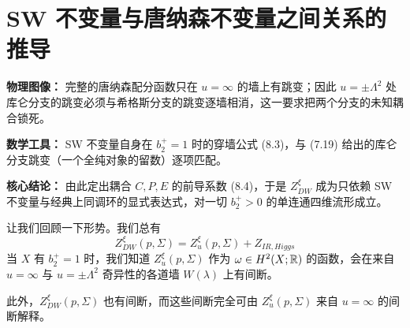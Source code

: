 
\section{SW 不变量与唐纳森不变量之间关系的推导}

\begin{keytakeaways}
\item \textbf{物理图像：} 完整的唐纳森配分函数只在 $u=\infty$ 的墙上有跳变；因此 $u=\pm\Lambda^{2}$ 处库仑分支的跳变必须与希格斯分支的跳变逐墙相消，这一要求把两个分支的未知耦合锁死。
\item \textbf{数学工具：} SW 不变量自身在 $b_2^{+}=1$ 时的穿墙公式 (8.3)，与 (7.19) 给出的库仑分支跳变（一个全纯对象的留数）逐项匹配。
\item \textbf{核心结论：} 由此定出耦合 $C,P,E$ 的前导系数 (8.4)，于是 $Z_{DW}^{\xi}$ 成为只依赖 SW 不变量与经典上同调环的显式表达式，对一切 $b_2^{+}>0$ 的单连通四维流形成立。
\end{keytakeaways}

让我们回顾一下形势。我们总有
\begin{equation}
Z_{DW}^{\xi}(p,\Sigma)=Z_u^{\xi}(p,\Sigma)+Z_{IR,Higgs}
\tag{8.1}
\end{equation}
当 $X$ 有 $b_2^{+}=1$ 时，我们知道 $Z_u^{\xi}(p,\Sigma)$ 作为 $\omega\in H^{2}(X;\mathbb{R})$ 的函数，会在来自 $u=\infty$ 与 $u=\pm\Lambda^{2}$ 奇异性的各道墙 $W(\lambda)$ 上有间断。

此外，$Z_{DW}^{\xi}(p,\Sigma)$ 也有间断，而这些间断完全可由 $Z_u^{\xi}(p,\Sigma)$ 来自 $u=\infty$ 的间断解释。

